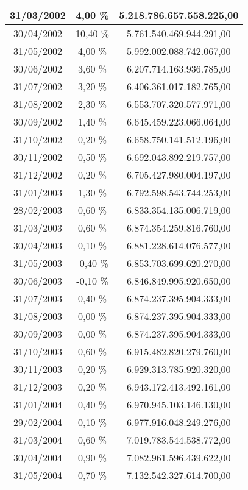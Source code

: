 \begin{center}
\begin{longtable}{|c|c|c|}
31/03/2002 & 4,00 \% & 5.218.786.657.558.225,00  \\ \hline
30/04/2002 & 10,40 \% & 5.761.540.469.944.291,00  \\ \hline
31/05/2002 & 4,00 \% & 5.992.002.088.742.067,00  \\ \hline
30/06/2002 & 3,60 \% & 6.207.714.163.936.785,00  \\ \hline
31/07/2002 & 3,20 \% & 6.406.361.017.182.765,00  \\ \hline
31/08/2002 & 2,30 \% & 6.553.707.320.577.971,00  \\ \hline
30/09/2002 & 1,40 \% & 6.645.459.223.066.064,00  \\ \hline
31/10/2002 & 0,20 \% & 6.658.750.141.512.196,00  \\ \hline
30/11/2002 & 0,50 \% & 6.692.043.892.219.757,00  \\ \hline
31/12/2002 & 0,20 \% & 6.705.427.980.004.197,00  \\ \hline
31/01/2003 & 1,30 \% & 6.792.598.543.744.253,00  \\ \hline
28/02/2003 & 0,60 \% & 6.833.354.135.006.719,00  \\ \hline
31/03/2003 & 0,60 \% & 6.874.354.259.816.760,00  \\ \hline
30/04/2003 & 0,10 \% & 6.881.228.614.076.577,00  \\ \hline
31/05/2003 & -0,40 \% & 6.853.703.699.620.270,00  \\ \hline
30/06/2003 & -0,10 \% & 6.846.849.995.920.650,00  \\ \hline
31/07/2003 & 0,40 \% & 6.874.237.395.904.333,00  \\ \hline
31/08/2003 & 0,00 \% & 6.874.237.395.904.333,00  \\ \hline
30/09/2003 & 0,00 \% & 6.874.237.395.904.333,00  \\ \hline
31/10/2003 & 0,60 \% & 6.915.482.820.279.760,00  \\ \hline
30/11/2003 & 0,20 \% & 6.929.313.785.920.320,00  \\ \hline
31/12/2003 & 0,20 \% & 6.943.172.413.492.161,00  \\ \hline
31/01/2004 & 0,40 \% & 6.970.945.103.146.130,00  \\ \hline
29/02/2004 & 0,10 \% & 6.977.916.048.249.276,00  \\ \hline
31/03/2004 & 0,60 \% & 7.019.783.544.538.772,00  \\ \hline
30/04/2004 & 0,90 \% & 7.082.961.596.439.622,00  \\ \hline
31/05/2004 & 0,70 \% & 7.132.542.327.614.700,00  \\ \hline

\end{longtable}
\end{center}
